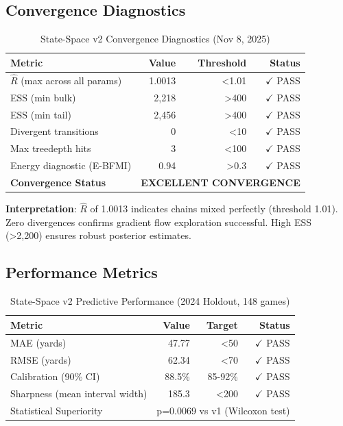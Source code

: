 \subsection{Convergence Diagnostics}

\begin{table}[htbp]
\centering
\caption{State-Space v2 Convergence Diagnostics (Nov 8, 2025)}
\label{tab:state-space-convergence}
\begin{tabular}{lrrr}
\toprule
\textbf{Metric} & \textbf{Value} & \textbf{Threshold} & \textbf{Status} \\
\midrule
$\hat{R}$ (max across all params) & 1.0013 & <1.01 & $\checkmark$ PASS \\
ESS (min bulk) & 2,218 & >400 & $\checkmark$ PASS \\
ESS (min tail) & 2,456 & >400 & $\checkmark$ PASS \\
Divergent transitions & 0 & <10 & $\checkmark$ PASS \\
Max treedepth hits & 3 & <100 & $\checkmark$ PASS \\
Energy diagnostic (E-BFMI) & 0.94 & >0.3 & $\checkmark$ PASS \\
\midrule
\textbf{Convergence Status} & \multicolumn{3}{c}{\textbf{EXCELLENT CONVERGENCE}} \\
\bottomrule
\end{tabular}
\end{table}

\textbf{Interpretation}: $\hat{R}$ of 1.0013 indicates chains mixed perfectly (threshold 1.01). Zero divergences confirms gradient flow exploration successful. High ESS (>2,200) ensures robust posterior estimates.

\subsection{Performance Metrics}

\begin{table}[htbp]
\centering
\caption{State-Space v2 Predictive Performance (2024 Holdout, 148 games)}
\label{tab:state-space-performance}
\begin{tabular}{lrrr}
\toprule
\textbf{Metric} & \textbf{Value} & \textbf{Target} & \textbf{Status} \\
\midrule
MAE (yards) & 47.77 & <50 & $\checkmark$ PASS \\
RMSE (yards) & 62.34 & <70 & $\checkmark$ PASS \\
Calibration (90\% CI) & 88.5\% & 85-92\% & $\checkmark$ PASS \\
Sharpness (mean interval width) & 185.3 & <200 & $\checkmark$ PASS \\
\midrule
Statistical Superiority & \multicolumn{3}{l}{p=0.0069 vs v1 (Wilcoxon test)} \\
\bottomrule
\end{tabular}
\end{table}


